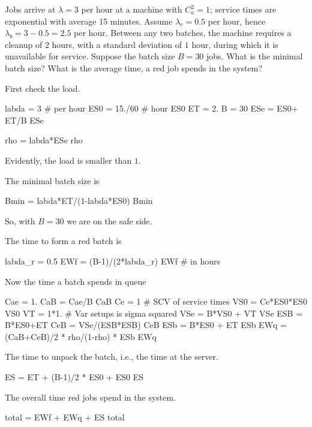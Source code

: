 \begin{exercise}
  Jobs arrive at $\lambda=3$ per hour at a machine with $C_a^2=1$; service times are exponential with average 15 minutes.  Assume $\lambda_r = 0.5$ per hour, hence $\lambda_b = 3-0.5=2.5$ per hour. Between any two batches, the machine requires a cleanup of 2 hours, with a standard deviation of $1$ hour, during which it is unavailable for service.  Suppose the batch size $B=30$ jobs. What is the minimal batch size?  What is the average time, a red job spends in the system? 
  \begin{solution}
First check the load.
\begin{pyconsole}
labda = 3 # per hour
ES0 = 15./60 # hour
ES0
ET = 2.
B = 30
ESe = ES0+ ET/B
ESe

rho = labda*ESe
rho
\end{pyconsole}
Evidently, the load is smaller than $1$. 

The minimal batch size is
\begin{pyconsole}
Bmin = labda*ET/(1-labda*ES0)
Bmin
\end{pyconsole}
So, with $B=30$ we are on the safe side. 

The time to form a red batch is 
\begin{pyconsole}
labda_r = 0.5
EWf = (B-1)/(2*labda_r)
EWf # in hours
\end{pyconsole}

Now the time a batch spends in queue
\begin{pyconsole}
Cae = 1.
CaB = Cae/B
CaB
Ce = 1 # SCV of service times
VS0 = Ce*ES0*ES0
VS0
VT = 1*1. # Var setups is sigma squared
VSe = B*VS0 + VT
VSe
ESB = B*ES0+ET
CeB = VSe/(ESB*ESB)
CeB
ESb = B*ES0 + ET
ESb
EWq = (CaB+CeB)/2 * rho/(1-rho) * ESb
EWq
\end{pyconsole}

The time to unpack the batch, i.e., the time at the server. 
\begin{pyconsole}
ES = ET + (B-1)/2 * ES0 + ES0  
ES
\end{pyconsole}


The overall time red jobs spend in the system.
\begin{pyconsole}
total = EWf + EWq + ES
total
\end{pyconsole}

  \end{solution}
\end{exercise}

